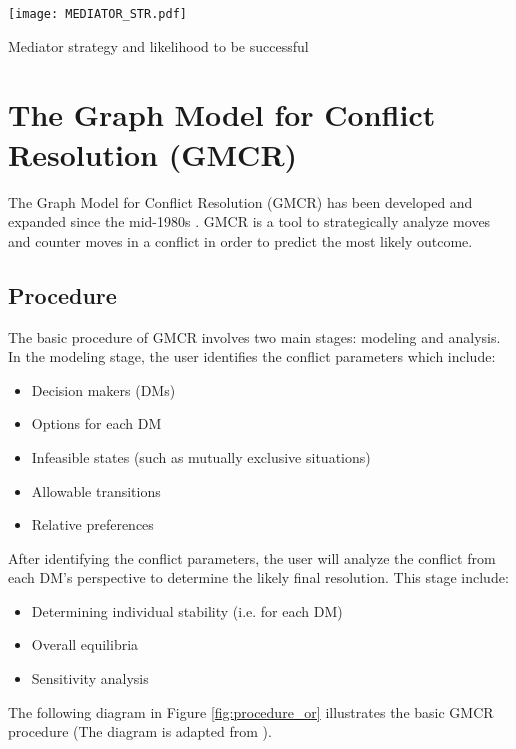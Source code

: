 \documentclass[letterpaper,12pt,titlepage,oneside,final]{book}
\begin{document}
\begin{center}

\begin{table}[H]
\centering
\texttt{[image: MEDIATOR\_STR.pdf]}

\caption{Mediator strategy and likelihood to be successful}

\label{tbl:MEDIATOR_STR}
\end{table}
\end{center}


\section{The Graph Model for Conflict Resolution (GMCR)}
The Graph Model for Conflict Resolution (GMCR) has been developed and expanded since the mid-1980s \citep{kilgour2005}. GMCR is a tool to strategically analyze moves and counter moves in a conflict in order to predict the most likely outcome. 
\subsection{Procedure}
The basic procedure of GMCR involves two main stages: modeling and analysis. In the modeling stage, the user identifies the conflict parameters which include:
\begin{itemize}
\item Decision makers (DMs)
\item Options for each DM
\item Infeasible states (such as mutually exclusive situations)
\item Allowable transitions
\item Relative preferences
\end{itemize}

After identifying the conflict parameters, the user will analyze the conflict from each DM's perspective to determine the likely final resolution. This stage include:
\begin{itemize}
\item Determining individual stability (i.e. for each DM)
\item Overall equilibria
\item Sensitivity analysis
\end{itemize}

The following diagram in Figure \ref{fig:procedure_or} illustrates the basic GMCR procedure (The diagram is adapted from \citet{fang1993}).
\end{document}
